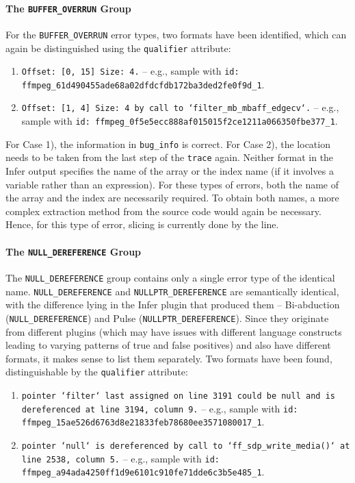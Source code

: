 \paragraph{The \texttt{BUFFER\_OVERRUN} Group}
For the \texttt{BUFFER\_OVERRUN} error types, two formats have been identified, which can again be distinguished using the \texttt{qualifier} attribute:
\begin{enumerate}
    \item \texttt{Offset: [0, 15] Size: 4.}
    \newline
    -- e.g., sample with \texttt{id: ffmpeg\_61d490455ade68a02dfdcfdb172ba3ded2fe0f9d\_1}.
    \item \texttt{Offset: [1, 4] Size: 4 by call to `filter\_mb\_mbaff\_edgecv`.} 
    \newline
    -- e.g., sample with \texttt{id: ffmpeg\_0f5e5ecc888af015015f2ce1211a066350fbe377\_1}.
\end{enumerate}
For Case 1), the information in \texttt{bug\_info} is correct. For Case 2), the location needs to be taken from the last step of the \texttt{trace} again. Neither format in the Infer output specifies the name of the array or the index name (if it involves a variable rather than an expression). For these types of errors, both the name of the array and the index are necessarily required. To obtain both names, a more complex extraction method from the source code would again be necessary. Hence, for this type of error, slicing is currently done by the line.

\paragraph{The \texttt{NULL\_DEREFERENCE} Group}
The \texttt{NULL\_DEREFERENCE} group contains only a single error type of the identical name. \texttt{NULL\_DEREFERENCE} and \texttt{NULLPTR\_DEREFERENCE} are semantically identical, with the difference lying in the Infer plugin that produced them -- Bi-abduction (\texttt{NULL\_DEREFERENCE}) and Pulse (\texttt{NULLPTR\_DEREFERENCE}). Since they originate from different plugins (which may have issues with different language constructs leading to varying patterns of true and false positives) and also have different formats, it makes sense to list them separately. Two formats have been found, distinguishable by the \texttt{qualifier} attribute:

\begin{enumerate}
    \item \texttt{pointer `filter` last assigned on line 3191 could be null and is
    \newline
    dereferenced at line 3194, column 9.}
    \newline
    -- e.g., sample with \texttt{id: ffmpeg\_15ae526d6763d8e21833feb78680ee3571080017\_1}.
    \item \texttt{pointer `null` is dereferenced by call to `ff\_sdp\_write\_media()` at
    \newline
    line 2538, column 5.}
    \newline
    -- e.g., sample with \texttt{id: ffmpeg\_a94ada4250ff1d9e6101c910fe71dde6c3b5e485\_1}.
\end{enumerate}

